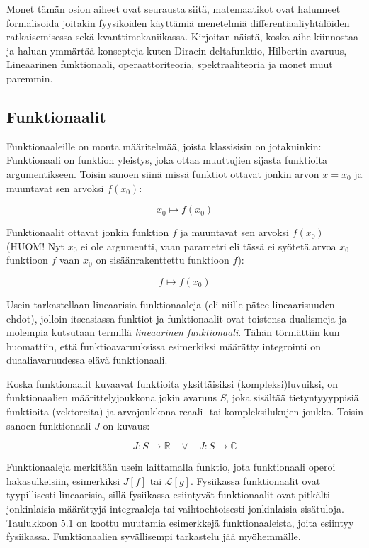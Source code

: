 \documentclass[../johdoksia.tex]{subfiles}
\begin{document}
	
	Monet tämän osion aiheet ovat seurausta siitä, matemaatikot ovat halunneet formalisoida joitakin fyysikoiden käyttämiä menetelmiä differentiaaliyhtälöiden ratkaisemisessa sekä kvanttimekaniikassa. Kirjoitan näistä, koska aihe kiinnostaa ja haluan ymmärtää konsepteja kuten Diracin deltafunktio, Hilbertin avaruus, Lineaarinen funktionaali, operaattoriteoria, spektraaliteoria ja monet muut paremmin.
	
	\subsection{Funktionaalit}
	
	Funktionaaleille on monta määritelmää, joista klassisisin on jotakuinkin: Funktionaali on funktion yleistys, joka ottaa muuttujien sijasta funktioita argumentikseen. Toisin sanoen siinä missä funktiot ottavat jonkin arvon $x = x_0$ ja muuntavat sen arvoksi $f(x_0)$:
	
	\begin{equation*}
		x_0 \mapsto f(x_0)
	\end{equation*}

	Funktionaalit ottavat jonkin funktion $f$ ja muuntavat sen arvoksi $f(x_0)$ (HUOM! Nyt $x_0$ ei ole argumentti, vaan parametri eli tässä ei syötetä arvoa $x_0$ funktioon $f$ vaan $x_0$ on sisäänrakenttettu funktioon $f$):
	
	\begin{equation*}
		f \mapsto f(x_0)
	\end{equation*}

	Usein tarkastellaan lineaarisia funktionaaleja (eli niille pätee lineaarisuuden ehdot), jolloin itseasiassa funktiot ja funktionaalit ovat toistensa dualismeja ja molempia kutsutaan termillä \emph{lineaarinen funktionaali}. Tähän törmättiin kun huomattiin, että funktioavaruuksissa esimerkiksi määrätty integrointi on duaaliavaruudessa elävä funktionaali.  
	
	Koska funktionaalit kuvaavat funktioita yksittäisiksi (kompleksi)luvuiksi, on funktionaalien määrittelyjoukkona jokin avaruus $S$, joka sisältää tietyntyyyppisiä funktioita (vektoreita) ja arvojoukkona reaali- tai kompleksilukujen joukko. Toisin sanoen funktionaali $J$ on kuvaus:
	
	\begin{equation*}
		J: S \to \mathbb{R} \ \ \ \ \lor \ \ \ \ J: S \to \mathbb{C}
	\end{equation*}
	
	Funktionaaleja merkitään usein laittamalla funktio, jota funktionaali operoi hakasulkeisiin, esimerkiksi $J[f]$ tai $\mathcal{L}[g]$. Fysiikassa funktionaalit ovat tyypillisesti lineaarisia, sillä fysiikassa esiintyvät funktionaalit ovat pitkälti jonkinlaisia määrättyjä integraaleja tai vaihtoehtoisesti jonkinlaisia sisätuloja. Taulukkoon 5.1 on koottu muutamia esimerkkejä funktionaaleista, joita esiintyy fysiikassa. Funktionaalien syvällisempi tarkastelu jää myöhemmälle.
	
\end{document}
